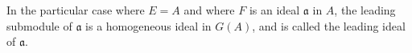 In the particular case where $E = A$ and where $F$ is an ideal $\mathfrak{a}$ in $A$, the leading submodule of $\mathfrak{a}$ is a homogeneous ideal in $G(A)$, and is called the leading ideal of $\mathfrak{a}$.